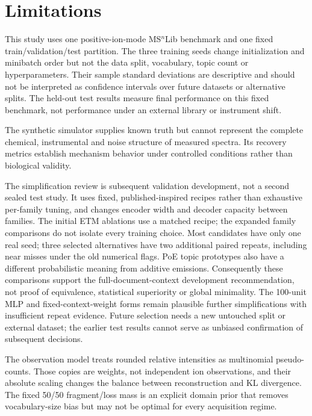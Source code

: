 \documentclass[10pt,a4paper]{article}
\begin{document}
\section{Limitations}

This study uses one positive-ion-mode MS$^{n}$Lib benchmark and one fixed
train/validation/test partition. The
three training seeds change initialization and minibatch order but not the
data split, vocabulary, topic count or hyperparameters. Their sample standard
deviations are descriptive and should not be interpreted as confidence
intervals over future datasets or alternative splits. The held-out test results
measure final performance on this fixed benchmark, not performance under an
external library or instrument shift.

The synthetic simulator supplies known truth but cannot represent the complete
chemical, instrumental and noise structure of measured spectra. Its recovery
metrics establish mechanism behavior under controlled conditions rather than
biological validity.

The simplification review is subsequent validation development, not a second
sealed test study. It uses fixed, published-inspired recipes rather than
exhaustive per-family tuning, and changes encoder width and decoder capacity
between families. The initial ETM ablations use a matched recipe; the expanded
family comparisons do not isolate every training choice. Most candidates have
only one real seed; three selected alternatives have two additional paired
repeats, including near misses under the old numerical flags. PoE topic prototypes also have a
different probabilistic meaning from additive emissions. Consequently these
comparisons support the full-document-context development recommendation,
not proof of equivalence, statistical superiority or global minimality. The
100-unit MLP and fixed-context-weight forms remain plausible further
simplifications with insufficient repeat evidence. Future
selection needs a new untouched split or external dataset; the earlier test
results cannot serve as unbiased confirmation of subsequent decisions.

The observation model treats rounded relative intensities as multinomial
pseudo-counts. Those copies are weights, not independent ion observations, and
their absolute scaling changes the balance between reconstruction and KL
divergence. The fixed 50/50 fragment/loss mass is an explicit domain prior that removes
vocabulary-size bias but may not be optimal for every acquisition regime.
\end{document}
